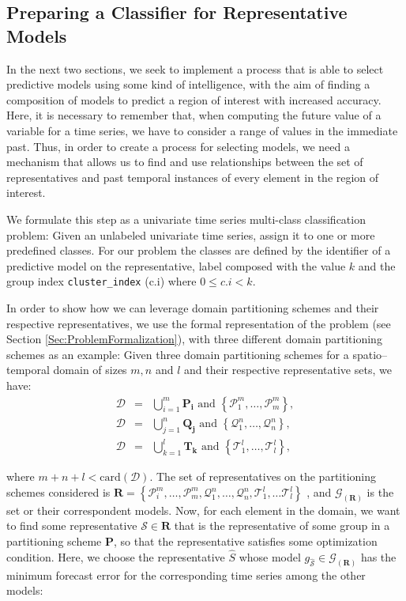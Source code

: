 \subsection{Preparing a Classifier for Representative Models}
\label{Sec:Classifier}

In the next two sections, we seek to implement a process that is able to select predictive models using some kind of intelligence, with the aim of finding a composition of models to predict a region of interest with increased accuracy. Here, it is  necessary to remember that, when computing the future value of a variable for a time series, we have to consider a range of values in the immediate past. Thus, in order to create a process for selecting models, we need a mechanism that allows us to find and use relationships between the set of representatives and past temporal instances of every element in the region of interest. 

We formulate this step as a univariate time series multi-class classification problem: Given an unlabeled univariate time series, assign it to one or more predefined classes. For our problem the classes are defined by the identifier of a predictive model on the representative, label composed with the value $k$ and the group index \texttt{cluster\_index} (c.i) where $0 \leq c.i <k$. 

In order to show how we can leverage domain partitioning schemes and their respective representatives, we use the formal representation of the problem (see Section \ref{Sec:ProblemFormalization}), with three different domain partitioning schemes as an example: Given three domain partitioning schemes for a spatio--temporal domain of sizes $m, n$ and $l$ and their respective representative sets, we have:
\begin{eqnarray} 
\nonumber
\mathcal{D}	& = & \bigcup_{i=1}^{m} \mathbf{P_i} \,\,\textrm{and} \,\, \left\{\mathcal{P}_{1}^{m}, \ldots, \mathcal{P}_{m}^{m}\right\},  \\ \nonumber
\mathcal{D} & = & \bigcup_{j=1}^{n} \mathbf{Q_j} \,\,\textrm{and} \,\, \left\{\mathcal{Q}_{1}^{n}, \ldots, \mathcal{Q}_{n}^{n}\right\}, \\ \nonumber 
\mathcal{D} & = & \bigcup_{k=1}^{l} \mathbf{T_k} \,\,\textrm{and} \,\, \left\{\mathcal{T}_{1}^{l}, \ldots, \mathcal{T}_{l}^{l}\right\},
\end{eqnarray}

where $m + n +l < \textrm{card}(\mathcal{D})$. The set of representatives on the partitioning schemes considered is $\mathbf{R} = \left\{\mathcal{P}_{i}^{m}, \ldots, \mathcal{P}_{m}^{m}, \mathcal{Q}_{1}^{n}, \ldots, \mathcal{Q}_{n}^{n}, \mathcal{T}_{1}^{l}, \ldots \mathcal{T}_{l}^{l} \right\}$ , and $\mathcal{G}_{(\mathbf{R})}$ is the set or their correspondent models. Now, for each element in the domain, we want to find some representative $\mathcal{S} \in \mathbf{R}$ that is the representative of some group in a partitioning scheme $\mathbf{P}$, so that the representative satisfies some optimization condition. Here, we choose the representative $\hat{S}$ whose model $g_{\mathcal{\hat{S}}} \in \mathcal{G}_{(\mathbf{R})}$ has the minimum forecast error for the corresponding time series among the other models:

